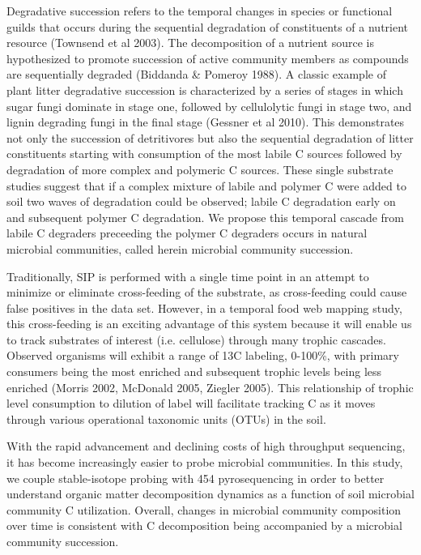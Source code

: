 Degradative succession refers to the temporal changes in species or functional guilds that occurs during the sequential degradation of constituents of a nutrient resource (Townsend et al 2003).  The decomposition of a nutrient source is hypothesized to promote succession of active community members as compounds are sequentially degraded (Biddanda & Pomeroy 1988).  A classic example of plant litter degradative succession is characterized by a series of stages in which sugar fungi dominate in stage one, followed by cellulolytic fungi in stage two, and lignin degrading fungi in the final stage (Gessner et al 2010).  This demonstrates not only the succession of detritivores but also the sequential degradation of litter constituents starting with consumption of the most labile C sources followed by degradation of more complex and polymeric C sources. These single substrate studies suggest that if a complex mixture of labile and polymer C were added to soil two waves of degradation could be observed; labile C degradation early on and subsequent polymer C degradation.  We propose this temporal cascade from labile C degraders preceeding the polymer C degraders occurs in natural microbial communities, called herein microbial community succession.   






 Traditionally, SIP is performed with a single time point in an attempt to minimize or eliminate cross-feeding of the substrate, as cross-feeding could cause false positives in the data set.  However, in a temporal food web mapping study, this cross-feeding is an exciting advantage of this system because it will enable us to track substrates of interest (i.e. cellulose) through many trophic cascades.  Observed organisms will exhibit a range of 13C labeling, 0-100\%, with primary consumers being the most enriched and subsequent trophic levels being less enriched (Morris 2002, McDonald 2005, Ziegler 2005).  This relationship of trophic level consumption to dilution of label will facilitate tracking C as it moves through various operational taxonomic units (OTUs) in the soil.  


With the rapid advancement and declining costs of high throughput sequencing, it has become increasingly easier to probe microbial communities.  In this study, we couple stable-isotope probing with 454 pyrosequencing in order to better understand organic matter decomposition dynamics as a function of soil microbial community C utilization. Overall, changes in microbial community composition over time is consistent with C decomposition being accompanied by a microbial community succession. 

